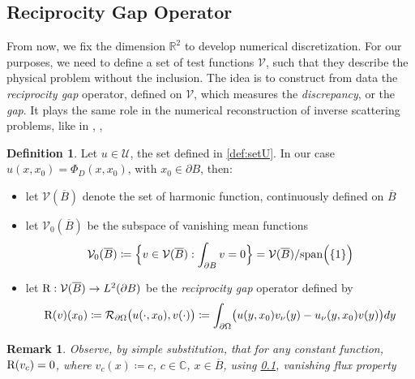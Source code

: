 \documentclass[10pt, a4paper, twoside, openright]{book}
\theoremstyle{definition}
\newtheorem{definition}[subsection]{Definition}
\theoremstyle{plain}
\theoremstyle{plain}
\theoremstyle{plain}
\theoremstyle{plain}
\newtheorem{remark}[subsection]{Remark}
\theoremstyle{plain}
\theoremstyle{plain}
\theoremstyle{plain}
\theoremstyle{plain}
\begin{document}
\subsection{Reciprocity Gap Operator}
From now, we fix the dimension $\mathbb{R}^2$ to develop numerical discretization. 
For our purposes, we need to define a set of test functions $\mathcal{V}$, such that they describe the physical problem without the inclusion. The idea is to construct from data the \emph{reciprocity gap} operator, defined on $\mathcal{V}$, which measures the \emph{discrepancy}, or the \emph{gap}.
It plays the same role in the numerical reconstruction of inverse scattering problems, like in \cite{colton-haddar:rg}, \cite{dicristo-sun:2006}, \cite{dicristo-sun:2007}
\begin{definition}
\label{def:setV}
Let $u\in\mathcal{U}$, the set defined in \ref{def:setU}. In our case $u(x,x_0)=\Phi_D(x,x_0)$, with $x_0 \in \partial B$, then:
\begin{itemize}
 \item let $\mathcal{V}(\overline{B})$ denote the set of harmonic function, continuously defined on $\overline{B}$
 \item let $\mathcal{V}_0(\overline{B})$ be the subspace of vanishing mean functions
 \begin{equation}
  \mathcal{V}_0(\overline{B})\coloneqq\Bigl\{v\in\mathcal{V}(\overline{B}):\int_{\partial B} v = 0\Bigr\}=\mathcal{V}(\overline{B})/\textup{span}\Bigl(\{1\}\Bigr)
 \end{equation}
 \item let $\textup{R} : \mathcal{V}(\overline{B})\to L^2(\partial B)$ be the \emph{reciprocity gap} operator defined by
\begin{equation}
 \textup{R}(v)(x_0)\coloneqq \mathcal{R}_{\partial\Omega}\bigl(u(\cdot,x_0),v(\cdot)\bigr)\coloneqq \int_{\partial \Omega}\bigl(u(y,x_0)v_\nu (y) - u_\nu(y,x_0)v(y)\bigr)dy
\end{equation}
\end{itemize}
\end{definition}
\begin{center}
\end{center}
\begin{remark}
 \label{rem:kernel-R}
 Observe, by simple substitution, that for any constant function, $\textup{R}(v_c)=0$, where $v_c(x)\coloneqq c$, $c\in\mathbb{C}$, $x\in\overline{B}$, using \ref{}, vanishing flux property
\end{remark}
\end{document}
